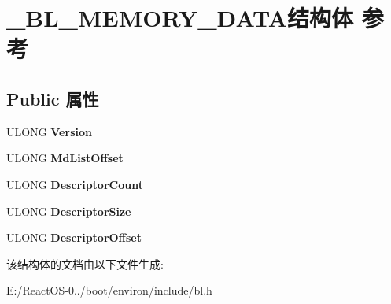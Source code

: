 \hypertarget{struct___b_l___m_e_m_o_r_y___d_a_t_a}{}\section{\+\_\+\+B\+L\+\_\+\+M\+E\+M\+O\+R\+Y\+\_\+\+D\+A\+T\+A结构体 参考}
\label{struct___b_l___m_e_m_o_r_y___d_a_t_a}
\subsection*{Public 属性}
\begin{DoxyCompactItemize}
\item 
\mbox{\label{struct___b_l___m_e_m_o_r_y___d_a_t_a_a5e3a702c584e037627bc4d65e465aec8}} 
U\+L\+O\+NG {\bfseries Version}
\item 
\mbox{\label{struct___b_l___m_e_m_o_r_y___d_a_t_a_aa2ad76a642b20c879e7feab12d3de503}} 
U\+L\+O\+NG {\bfseries Md\+List\+Offset}
\item 
\mbox{\label{struct___b_l___m_e_m_o_r_y___d_a_t_a_a5760776f4dd48be20ebac4e6aa6739f9}} 
U\+L\+O\+NG {\bfseries Descriptor\+Count}
\item 
\mbox{\label{struct___b_l___m_e_m_o_r_y___d_a_t_a_a7e5f37b57b27a3ad12d43c55f69ddd06}} 
U\+L\+O\+NG {\bfseries Descriptor\+Size}
\item 
\mbox{\label{struct___b_l___m_e_m_o_r_y___d_a_t_a_ae766c2e422efcc824816842e4a6f2fd5}} 
U\+L\+O\+NG {\bfseries Descriptor\+Offset}
\end{DoxyCompactItemize}


该结构体的文档由以下文件生成\+:\begin{DoxyCompactItemize}
\item 
E\+:/\+React\+O\+S-\/0../boot/environ/include/bl.\+h\end{DoxyCompactItemize}

